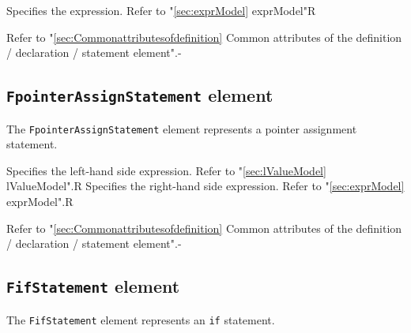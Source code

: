 \begin{XcodeMLChildElements}
{Specifies the expression. Refer to "\ref{sec:exprModel} exprModel"}{R}
\end{XcodeMLChildElements}

\begin{XcodeMLAttributes}
{Refer to "\ref{sec:Commonattributesofdefinition} Common attributes of the definition / declaration / statement element".}{-}
\end{XcodeMLAttributes}


\subsection{ {\tt FpointerAssignStatement} element}

The {\tt FpointerAssignStatement} element represents a pointer assignment statement.


\begin{XcodeMLChildElements}
{Specifies the left-hand side expression. Refer to "\ref{sec:lValueModel} lValueModel".}{R}
{Specifies the right-hand side expression. Refer to "\ref{sec:exprModel} exprModel".}{R}
\end{XcodeMLChildElements}

\begin{XcodeMLAttributes}
{Refer to "\ref{sec:Commonattributesofdefinition} Common attributes of the definition / declaration / statement element".}{-}
\end{XcodeMLAttributes}


\subsection{ {\tt FifStatement} element}

The {\tt FifStatement} element represents an {\tt if} statement.


